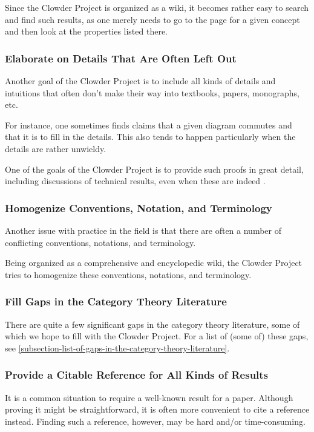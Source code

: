 Since the Clowder Project is organized as a wiki, it becomes rather easy to search and find such results, as one merely needs to go to the page for a given concept and then look at the properties listed there.
\subsubsection{Elaborate on Details That Are Often Left Out}\label{subsubsection-elaborate-on-details-that-are-often-left-out}
Another goal of the Clowder Project is to include all kinds of details and intuitions that often don't make their way into textbooks, papers, monographs, etc.

For instance, one sometimes finds claims that a given diagram commutes and that it is  to fill in the details. This also tends to happen particularly when the details are rather unwieldy.

One of the goals of the Clowder Project is to provide such proofs in great detail, including discussions of technical results, even when these are indeed .
\subsubsection{Homogenize Conventions, Notation, and Terminology}\label{subsubsection-homogenize-conventions-notation-and-terminology}
Another issue with practice in the field is that there are often a number of conflicting conventions, notations, and terminology.

Being organized as a comprehensive and encyclopedic wiki, the Clowder Project tries to homogenize these conventions, notations, and terminology.
\subsubsection{Fill Gaps in the Category Theory Literature}\label{subsubsection-fill-gaps-in-the-category-theory-literature}
There are quite a few significant gaps in the category theory literature, some of which we hope to fill with the Clowder Project. For a list of (some of) these gaps, see \cref{subsection-list-of-gaps-in-the-category-theory-literature}.
\subsubsection{Provide a Citable Reference for All Kinds of Results}\label{subsubsection-provide-a-citable-reference-for-all-kinds-of-results}
It is a common situation to require a well-known result for a paper. Although proving it might be straightforward, it is often more convenient to cite a reference instead. Finding such a reference, however, may be hard and/or time-consuming.

